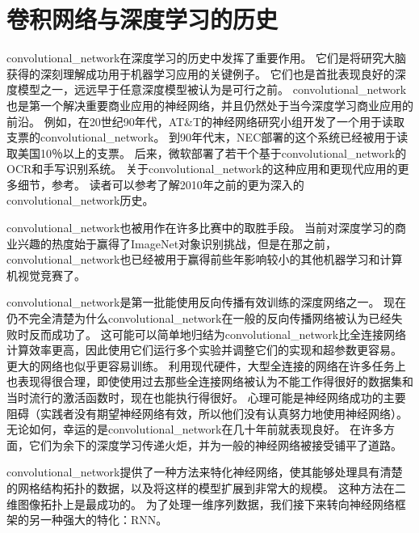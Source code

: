 \section{卷积网络与深度学习的历史}
\label{sec:convolutional_networks_and_the_history_of_deep_learning}
 
 
\gls{convolutional_network}在深度学习的历史中发挥了重要作用。
它们是将研究大脑获得的深刻理解成功用于机器学习应用的关键例子。
它们也是首批表现良好的深度模型之一，远远早于任意深度模型被认为是可行之前。
\gls{convolutional_network}也是第一个解决重要商业应用的神经网络，并且仍然处于当今深度学习商业应用的前沿。
例如，在20世纪90年代，AT\&T的神经网络研究小组开发了一个用于读取支票的\gls{convolutional_network}\citep{LeCun98-small}。
到90年代末，NEC部署的这个系统已经被用于读取美国10％以上的支票。
后来，微软部署了若干个基于\gls{convolutional_network}的OCR和手写识别系统\citep{simard-03-small}。 
关于\gls{convolutional_network}的这种应用和更现代应用的更多细节，参考。
读者可以参考\citep{Lecun_convolutionalnetworks}了解2010年之前的更为深入的\gls{convolutional_network}历史。

\gls{convolutional_network}也被用作在许多比赛中的取胜手段。
当前对深度学习的商业兴趣的热度始于\cite{Krizhevsky-2012-small}赢得了ImageNet对象识别挑战，但是在那之前，\gls{convolutional_network}也已经被用于赢得前些年影响较小的其他机器学习和计算机视觉竞赛了。
 
 
\gls{convolutional_network}是第一批能使用反向传播有效训练的深度网络之一。
现在仍不完全清楚为什么\gls{convolutional_network}在一般的反向传播网络被认为已经失败时反而成功了。
这可能可以简单地归结为\gls{convolutional_network}比全连接网络计算效率更高，因此使用它们运行多个实验并调整它们的实现和超参数更容易。
更大的网络也似乎更容易训练。
利用现代硬件，大型全连接的网络在许多任务上也表现得很合理，即使使用过去那些全连接网络被认为不能工作得很好的数据集和当时流行的激活函数时，现在也能执行得很好。
心理可能是神经网络成功的主要阻碍（实践者没有期望神经网络有效，所以他们没有认真努力地使用神经网络）。
无论如何，幸运的是\gls{convolutional_network}在几十年前就表现良好。
在许多方面，它们为余下的深度学习传递火炬，并为一般的神经网络被接受铺平了道路。

\gls{convolutional_network}提供了一种方法来特化神经网络，使其能够处理具有清楚的网格结构拓扑的数据，以及将这样的模型扩展到非常大的规模。 
这种方法在二维图像拓扑上是最成功的。
为了处理一维序列数据，我们接下来转向神经网络框架的另一种强大的特化：\gls{RNN}。

 
